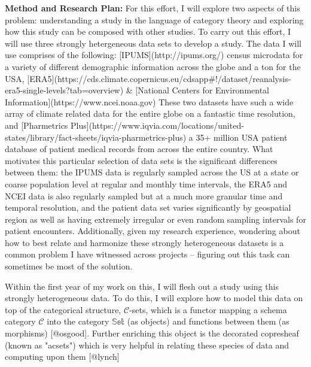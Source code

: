 \documentclass[11pt]{extarticle}
\begin{document}
\textbf{Method and Research Plan:}  For this effort, I will explore two aspects of this problem: understanding a study in the language of category theory and exploring how this study can be composed with other studies.
To carry out this effort, I will use three strongly hetergeneous data sets to develop a study. 
The data I will use comprises of the following: [IPUMS](http://ipums.org/) census microdata for a variety of different demographic information across the globe and a ton for the USA, [ERA5](https://cds.climate.copernicus.eu/cdsapp#!/dataset/reanalysis-era5-single-levels?tab=overview) & [National Centers for Environmental Information](https://www.ncei.noaa.gov) These two datasets have such a wide array of climate related data for the entire globe on a fantastic time resolution, and [Pharmetrics Plus](https://www.iqvia.com/locations/united-states/library/fact-sheets/iqvia-pharmetrics-plus) a 35+ million USA patient database of patient medical records from across the entire country.
What motivates this particular selection of data sets is the significant differences between them: the IPUMS data is regularly sampled across the US at a state or coarse population level at regular and monthly time intervals, the ERA5 and NCEI data is also regularly sampled but at a much more granular time and temporal resolution, and the patient data set varies significantly by geospatial region as well as having extremely irregular or even random sampling intervals for patient encounters.
Additionally, given my research experience, wondering about how to best relate and harmonize these strongly heterogeneous datasets is a common problem I have witnessed across projects -- figuring out this task can sometimes be most of the solution.

Within the first year of my work on this, I will flesh out a study using this strongly heterogeneous data.
To do this, I will explore how to model this data on top of the categorical structure, $\mathscr{C}$-sets, which is a functor mapping a schema category $\mathscr{C}$ into the category $\mathbb{Set}$ (as objects) and functions between them (as morphisms) [@osgood].
Further enriching this object is the decorated copresheaf (known as "acsets") which is very helpful in relating these species of data and computing upon them [@lynch]
\end{document}
